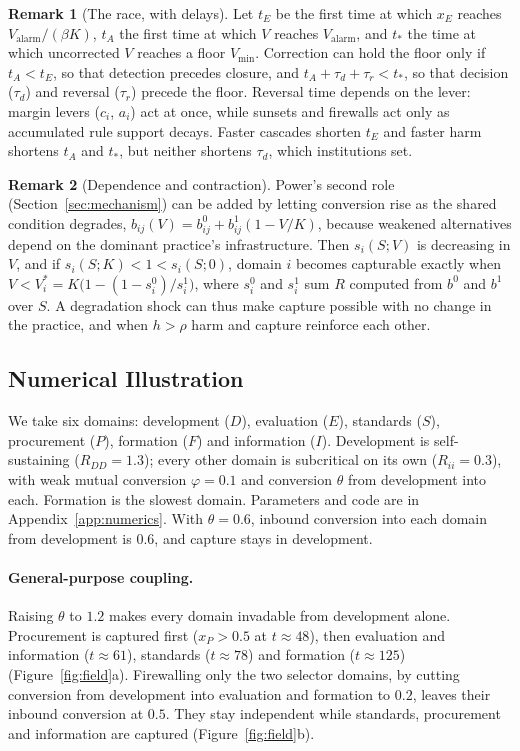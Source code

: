 \documentclass[letterpaper]{article} %
\theoremstyle{definition}
\newtheorem{remark}{Remark}
\begin{document}
\begin{remark}[The race, with delays]\label{rem:race}
Let $t_E$ be the first time at which $x_E$ reaches $V_{\mathrm{alarm}}/(\beta K)$, $t_A$ the first time at which $V$ reaches $V_{\mathrm{alarm}}$, and $t_\ast$ the time at which uncorrected $V$ reaches a floor $V_{\min}$. Correction can hold the floor only if $t_A<t_E$, so that detection precedes closure, and $t_A+\tau_d+\tau_r<t_\ast$, so that decision ($\tau_d$) and reversal ($\tau_r$) precede the floor. Reversal time depends on the lever: margin levers ($c_i$, $a_i$) act at once, while sunsets and firewalls act only as accumulated rule support decays. Faster cascades shorten $t_E$ and faster harm shortens $t_A$ and $t_\ast$, but neither shortens $\tau_d$, which institutions set.
\end{remark}

\begin{remark}[Dependence and contraction]\label{rem:dependence}
Power's second role (Section~\ref{sec:mechanism}) can be added by letting conversion rise as the shared condition degrades, $b_{ij}(V)=b^0_{ij}+b^1_{ij}(1-V/K)$, because weakened alternatives depend on the dominant practice's infrastructure. Then $s_i(S;V)$ is decreasing in $V$, and if $s_i(S;K)<1<s_i(S;0)$, domain $i$ becomes capturable exactly when $V<V^\ast_i=K\big(1-(1-s^0_i)/s^1_i\big)$, where $s^0_i$ and $s^1_i$ sum $R$ computed from $b^0$ and $b^1$ over $S$. A degradation shock can thus make capture possible with no change in the practice, and when $h>\rho$ harm and capture reinforce each other.
\end{remark}

\subsection{Numerical Illustration}

We take six domains: development ($D$), evaluation ($E$), standards ($S$), procurement ($P$), formation ($F$) and information ($I$). Development is self-sustaining ($R_{DD}=1.3$); every other domain is subcritical on its own ($R_{ii}=0.3$), with weak mutual conversion $\varphi=0.1$ and conversion $\theta$ from development into each. Formation is the slowest domain. Parameters and code are in Appendix~\ref{app:numerics}. With $\theta=0.6$, inbound conversion into each domain from development is $0.6$, and capture stays in development.

\paragraph{General-purpose coupling.} Raising $\theta$ to $1.2$ makes every domain invadable from development alone. Procurement is captured first ($x_P>0.5$ at $t\approx48$), then evaluation and information ($t\approx61$), standards ($t\approx78$) and formation ($t\approx125$) (Figure~\ref{fig:field}a). Firewalling only the two selector domains, by cutting conversion from development into evaluation and formation to $0.2$, leaves their inbound conversion at $0.5$. They stay independent while standards, procurement and information are captured (Figure~\ref{fig:field}b).
\end{document}
